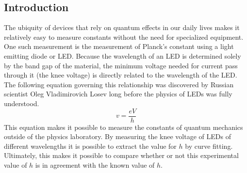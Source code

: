 \documentclass[12pt]{spieman}  %
\begin{document}
    \begin{spacing}{2}

        \section{Introduction}\label{sec:intro}
        The ubiquity of devices that rely on quantum effects in our daily lives makes it relatively easy to measure
        constants without the need for specialized equipment.
        One such measurement is the measurement of Planck's constant using a light emitting diode or LED\@.
        Because the wavelength of an LED is determined solely by the band gap of the material, the minimum voltage
        needed for current pass through it (the knee voltage) is directly related to the wavelength of the LED\@.
        The following equation governing this relationship was discovered by Russian scientist Oleg Vladimirovich
        Losev long before the physics of LEDs was fully understood.\cite{Zheludev_2007}
        \begin{equation}
            \label{eq:master}
            v=\frac{eV}{h}
        \end{equation}
        This equation makes it possible to measure the constants of quantum mechanics outside of the physics laboratory.
        By measuring the knee voltage of LEDs of different wavelengths it is possible to extract the value for $h$ by
        curve fitting.
        Ultimately, this makes it possible to compare whether or not this experimental value of $h$ is in agreement
        with the known value of $h$.



\end{spacing}
\end{document}
